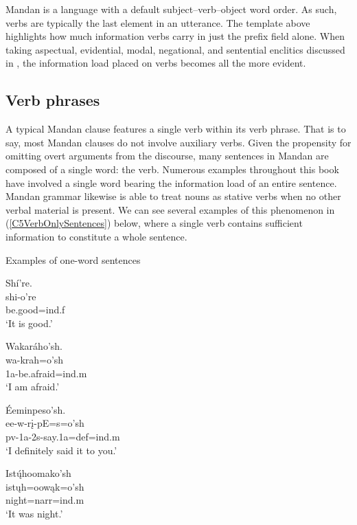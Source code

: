 Mandan is a language with a default subject--verb--object word order. As such, verbs are typically the last element in an utterance. The template above highlights how much information verbs carry in just the prefix field alone. When taking aspectual, evidential, modal, negational, and sentential enclitics discussed in , the information load placed on verbs becomes all the more evident.

\subsection{Verb phrases}\label{Ch5VerbPhrases}

A typical Mandan clause features a single verb within its verb phrase. That is to say, most Mandan clauses do not involve auxiliary verbs. Given the propensity for omitting overt arguments from the discourse, many sentences in Mandan are composed of a single word: the verb. Numerous examples throughout this book have involved a single word bearing the information load of an entire sentence. Mandan grammar likewise is able to treat nouns as stative verbs when no other verbal material is present. We can see several examples of this phenomenon in (\ref{C5VerbOnlySentences}) below, where a single verb contains sufficient information to constitute a whole sentence.

\begin{exe}
    \item\label{C5VerbOnlySentences} Examples of one-word sentences

    \begin{xlist}
        \item\label{C5VerbOnlySentencesA} \glll Shí're.\\
        shi-o're\\
        \textnormal{be.good}=ind.f\\
        \glt `It is good.' \citep[15]{hollow1976}

        \item\label{Ch5VerbOnlySentencesB} \glll Wakaráho'sh.\\
        wa-krah=o'sh\\
        1a-\textnormal{be.afraid}=ind.m\\
        \glt `I am afraid.' \citep[4]{hollow1973b}

        \item\label{Ch5VerbOnlySentencesC} \glll Éeminpeso'sh.\\
        ee-w-rį-pE=s=o'sh\\
        pv-1a-2s-\textnormal{say}.1a=def=ind.m\\
        \glt `I definitely said it to you.' \citep[320]{hollow1973b}

        \item\label{Ch5VerbOnlySentencesD} \glll Istų́hoomako'sh\\
        istųh=oowąk=o'sh\\
        \textnormal{night}=narr=ind.m\\
        \glt `It was night.' \citep[171]{hollow1973b}
    \end{xlist}
\end{exe}

